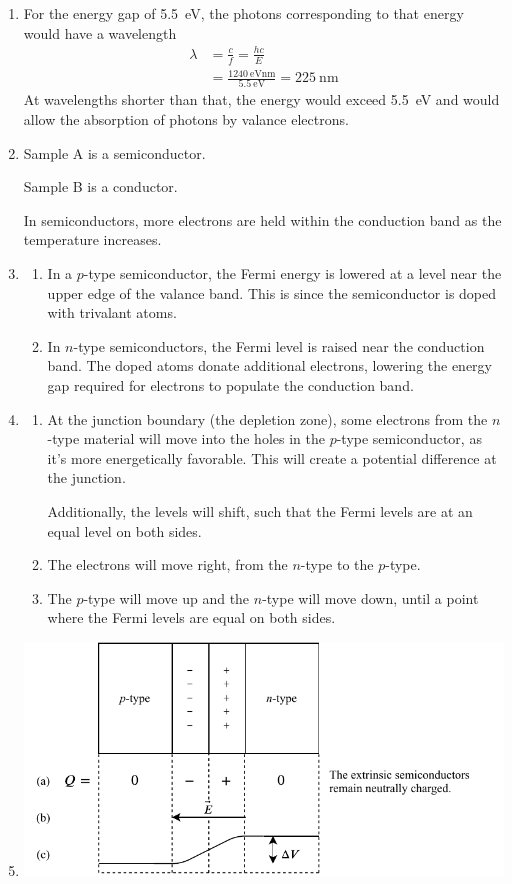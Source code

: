 \documentclass{homework}
\begin{document}
\begin{enumerate}[label={\arabic*.}]
		\item For the energy gap of \SI{5.5}{\eV}, the photons corresponding to that energy would have a wavelength \begin{align*}
			\lambda & = \frac{c}{f} = \frac{hc}{E} \\
				& = \frac{\SI{1240}{\eV \nm}}{\SI{5.5}{\eV}} = \SI{225}{\nm}
		\end{align*}
		At wavelengths shorter than that, the energy would exceed \SI{5.5}{\eV} and would allow the absorption of photons by valance electrons.
		
		\item Sample A is a semiconductor.
			
			Sample B is a conductor.
			
			In semiconductors, more electrons are held within the conduction band as the temperature increases. 
			
		\item  \begin{enumerate}
			\item In a $p$-type semiconductor, the Fermi energy is lowered at a level near the upper edge of the valance band. This is since the semiconductor is doped with trivalant atoms. 
			\item In $n$-type semiconductors, the Fermi level is raised near the conduction band. The doped atoms donate additional electrons, lowering the energy gap required for electrons to populate the conduction band.
		\end{enumerate}
	
		\item \begin{enumerate}
			\item At the junction boundary (the depletion zone), some electrons from the $n$-type material will move into the holes in the $p$-type semiconductor, as it's more energetically favorable. This will create a potential difference at the junction.
			
			Additionally, the levels will shift, such that the Fermi levels are at an equal level on both sides.
			
			\item The electrons will move right, from the $n$-type to the $p$-type.
			
			\item The $p$-type will move up and the $n$-type will move down, until a point where the Fermi levels are equal on both sides. 
		\end{enumerate}
	
	\item \includegraphics[valign=t]{hw10pn}
	\end{enumerate}
\end{document}

